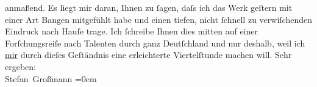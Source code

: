 \begin{ledgroupsized}[t]{13cm}
               anmaßend.\pend
           \pstart
           Es liegt mir daran, Ihnen zu ſagen, daſs ich das Werk geſtern mit einer Art Bangen
               mitgefühlt habe und einen tiefen, nicht ſchnell zu verwiſchenden Eindruck nach Hauſe
               trage.\pend
           \pstart
           Ich ſchreibe Ihnen dies mitten auf einer Forſchungsreiſe nach Talenten durch ganz Deutſchland und nur deshalb, {\pb}weil ich \uline{mir}
               durch dieſes Geſtändnis eine erleichterte Viertelſtunde machen will.\pend
           \pstart
           Sehr ergeben:{\\[\baselineskip]}\spacefill\mbox{Stefan Großmann}\pend
           \leftskip=0em{}
         
         \endnumbering{}\end{ledgroupsized}  \newcommand{\dateiname}{L02052}\newcommand{\titel}{Stefan Großmann an Arthur Schnitzler, 5. 2. 1912}\newcommand{\editorInnen}{ Martin Anton Müller und Gerd-Hermann Susen}
      